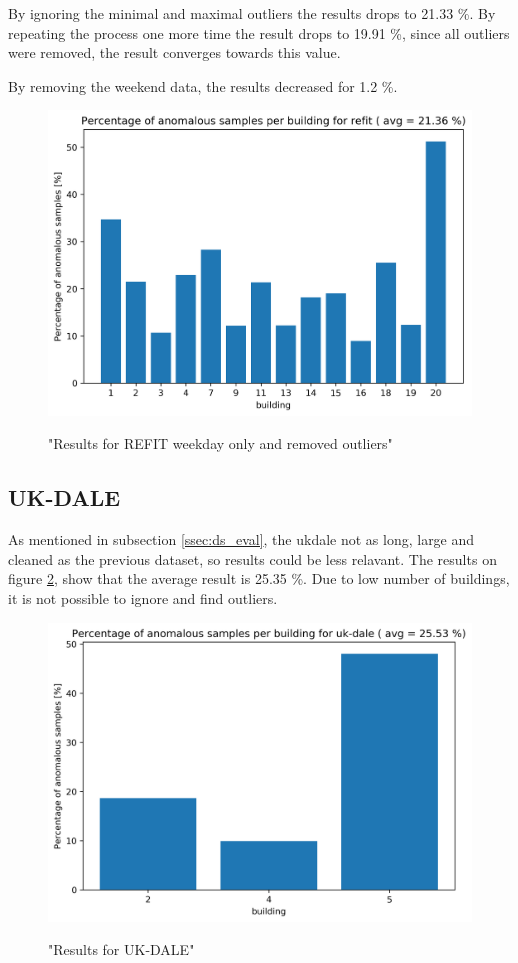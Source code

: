 By ignoring the minimal and maximal outliers the results drops to 21.33 \%.
By repeating the process one more time the result drops to 19.91 \%, since all outliers were removed, the result converges towards this value. 

By removing the weekend data, the results decreased for 1.2 \%. 

\begin{figure}[H]
	\centering
	\caption{"Results for REFIT weekday only and removed outliers"}
	\includegraphics[width=1\textwidth]{Figures/EC/refit_res_nw_2.png}
	\label{fig:refit_res_nw_2"}
\end{figure}

\subsection{UK-DALE}

As mentioned in subsection \ref{ssec:ds_eval}, the ukdale not as long, large and cleaned as the previous dataset, so results could be less relavant.
The results on figure \ref{fig:ukdale_res}, show that the average result is 25.35 \%. Due to low number of buildings, it is not possible to ignore and find outliers. 
\begin{figure}[H]
	\centering
	\caption{"Results for UK-DALE"}
	\includegraphics[width=1\textwidth]{Figures/EC/ukdale_res.png}
	\label{fig:ukdale_res}
\end{figure}

